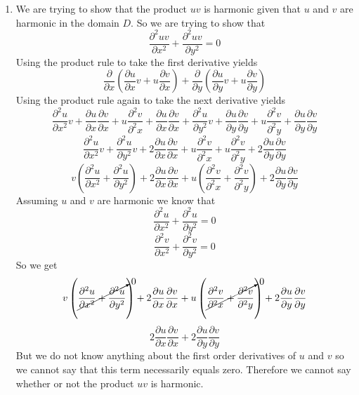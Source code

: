 \documentclass[11pt]{article}
\begin{document}
\begin{enumerate}
\begin{enumerate}
\item We are trying to show that the product $uv$ is harmonic given that $u$ and $v$ are harmonic in the domain $D$. So we are trying to show that 
$$\frac{\partial^2 uv}{\partial x^2} +\frac{\partial^2 uv}{\partial y^2} =0$$
Using the product rule to take the first derivative yields
$$\frac{\partial}{\partial x}\left(\frac{\partial u}{\partial x}v+u\frac{\partial v}{\partial x}\right) + \frac{\partial}{\partial y}\left(\frac{\partial u}{\partial y}v+u\frac{\partial v}{\partial y}\right)$$
Using the product rule again to take the next derivative yields
$$\frac{\partial^2 u}{\partial x^2}v+\frac{\partial u}{\partial x}\frac{\partial v}{\partial x}+u\frac{\partial^2 v}{\partial^2 x}+\frac{\partial u}{\partial x}\frac{\partial v}{\partial x} + \frac{\partial^2 u}{\partial y^2}v+\frac{\partial u}{\partial y}\frac{\partial v}{\partial y}+u\frac{\partial^2 v}{\partial^2 y}+\frac{\partial u}{\partial y}\frac{\partial v}{\partial y} $$
$$\frac{\partial^2 u}{\partial x^2}v+ \frac{\partial^2 u}{\partial y^2}v+2\frac{\partial u}{\partial x}\frac{\partial v}{\partial x}+u\frac{\partial^2 v}{\partial^2 x} + u\frac{\partial^2 v}{\partial^2 y}+2\frac{\partial u}{\partial y}\frac{\partial v}{\partial y} $$
$$v\left(\frac{\partial^2 u}{\partial x^2}+ \frac{\partial^2 u}{\partial y^2}\right)+2\frac{\partial u}{\partial x}\frac{\partial v}{\partial x}+u\left(\frac{\partial^2 v}{\partial^2 x} + \frac{\partial^2 v}{\partial^2 y}\right)+2\frac{\partial u}{\partial y}\frac{\partial v}{\partial y} $$
Assuming $u$ and $v$ are harmonic we know that
$$\frac{\partial^2 u}{\partial x^2} +\frac{\partial^2 u}{\partial y^2} =0$$
$$\frac{\partial^2 v}{\partial x^2} +\frac{\partial^2 v}{\partial y^2} =0$$
So we get 
$$v\left(\cancelto{0}{\frac{\partial^2 u}{\partial x^2}+ \frac{\partial^2 u}{\partial y^2}}\right)+2\frac{\partial u}{\partial x}\frac{\partial v}{\partial x}+u\left(\cancelto{0}{\frac{\partial^2 v}{\partial^2 x} + \frac{\partial^2 v}{\partial^2 y}}\right)+2\frac{\partial u}{\partial y}\frac{\partial v}{\partial y} $$
$$2\frac{\partial u}{\partial x}\frac{\partial v}{\partial x}+2\frac{\partial u}{\partial y}\frac{\partial v}{\partial y} $$
But we do not know anything about the first order derivatives of $u$ and $v$ so we cannot say that this term necessarily equals zero. Therefore we cannot say whether or not the product $uv$ is harmonic.


\end{enumerate}
\end{enumerate}
\end{document}
